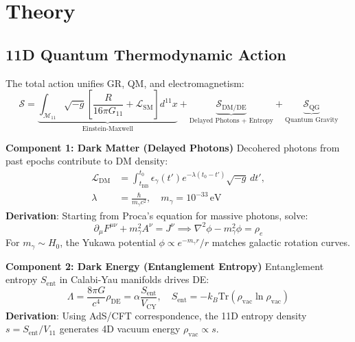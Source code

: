 \documentclass[12pt, a4paper]{article}
\begin{document}
\section{Theory}
\label{sec:theory}

\subsection{11D Quantum Thermodynamic Action}
\label{subsec:action}
The total action unifies GR, QM, and electromagnetism:
\begin{equation}
\mathcal{S} = \underbrace{\int_{\mathcal{M}_{11}} \sqrt{-g} \left[ \frac{R}{16\pi G_{11}} + \mathcal{L}_{\text{SM}} \right] d^{11}x}_{\text{Einstein-Maxwell}} + \underbrace{\mathcal{S}_{\text{DM/DE}}}_{\text{Delayed Photons + Entropy}} + \underbrace{\mathcal{S}_{\text{QG}}}_{\text{Quantum Gravity}}
\label{eq:total_action}
\end{equation}

\textbf{Component 1: Dark Matter (Delayed Photons)}
Decohered photons from past epochs contribute to DM density:
\begin{align}
\mathcal{L}_{\text{DM}} &= \int_{t_{\text{BB}}}^{t_0} \epsilon_\gamma(t') e^{-\lambda(t_0 - t')} \sqrt{-g} \, dt', \\
\lambda &= \frac{\hbar}{m_\gamma c^2}, \quad m_\gamma = 10^{-33} \, \text{eV}
\label{eq:dm_lagrangian}
\end{align}
\textbf{Derivation}: Starting from Proca's equation for massive photons, solve:
\begin{equation}
\partial_\mu F^{\mu\nu} + m_\gamma^2 A^\nu = J^\nu \implies \nabla^2 \phi - m_\gamma^2 \phi = \rho_e
\label{eq:proca}
\end{equation}
For \( m_\gamma \sim H_0 \), the Yukawa potential \( \phi \propto e^{-m_\gamma r}/r \) matches galactic rotation curves.

\textbf{Component 2: Dark Energy (Entanglement Entropy)}
Entanglement entropy \( S_{\text{ent}} \) in Calabi-Yau manifolds drives DE:
\begin{equation}
\Lambda = \frac{8\pi G}{c^4} \rho_{\text{DE}} = \alpha \frac{S_{\text{ent}}}{V_{\text{CY}}}, \quad S_{\text{ent}} = -k_B \text{Tr}(\rho_{\text{vac}} \ln \rho_{\text{vac}})
\label{eq:de}
\end{equation}
\textbf{Derivation}: Using AdS/CFT correspondence, the 11D entropy density \( s = S_{\text{ent}}/V_{11} \) generates 4D vacuum energy \( \rho_{\text{vac}} \propto s \).
\end{document}
